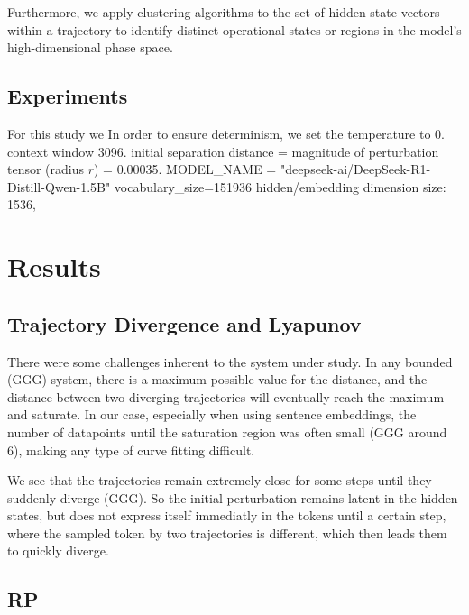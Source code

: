 \documentclass[a4paper,12pt]{article}
\begin{document}
Furthermore, we apply clustering algorithms to the set of hidden state vectors within a trajectory to identify distinct operational states or regions in the model's high-dimensional phase space.

\subsection{Experiments}

For this study we 
In order to ensure determinism, we set the temperature to 0. context window 3096. initial separation distance = magnitude of perturbation tensor (radius $r$) = 0.00035. MODEL_NAME = "deepseek-ai/DeepSeek-R1-Distill-Qwen-1.5B"
vocabulary_size=151936
hidden/embedding dimension size: 1536,

\section{Results}

\subsection{Trajectory Divergence and Lyapunov} \label{res:lyapunov} %

There were some challenges inherent to the system under study. In any bounded (GGG) system, there is a maximum possible value for the distance, and the distance between two diverging trajectories will eventually reach the maximum and saturate. In our case, especially when using sentence embeddings, the number of datapoints until the saturation region was often small (GGG around 6), making any type of curve fitting difficult.

We see that the trajectories remain extremely close for some steps until they suddenly diverge (GGG). So the initial perturbation remains latent in the hidden states, but does not express itself immediatly in the tokens until a certain step, where the sampled token by two trajectories is different, which then leads them to quickly diverge.

\subsection{RP}
\end{document}
